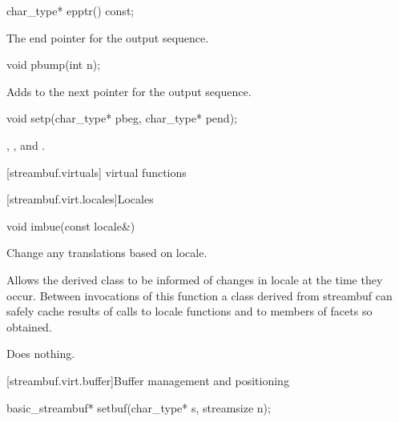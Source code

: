 %
\begin{itemdecl}
char_type* epptr() const;
\end{itemdecl}

\begin{itemdescr}
\pnum
\returns
The end pointer for the output sequence.
\end{itemdescr}

%
\begin{itemdecl}
void pbump(int n);
\end{itemdecl}

\begin{itemdescr}
\pnum
\effects
Adds  to the next pointer for the output sequence.
\end{itemdescr}

%
\begin{itemdecl}
void setp(char_type* pbeg, char_type* pend);
\end{itemdecl}

\begin{itemdescr}
\pnum
\postconditions
{},
,
and
.
\end{itemdescr}

[streambuf.virtuals]{ virtual functions}

[streambuf.virt.locales]{Locales}

%
\begin{itemdecl}
void imbue(const locale&)
\end{itemdecl}

\begin{itemdescr}
\pnum
\effects
Change any translations based on locale.

\pnum
\notes
Allows the derived class to be informed of changes in locale at the
time they occur.
Between invocations of this function a class derived
from streambuf can safely cache results of calls to locale functions
and to members of facets so obtained.

\pnum
{}
Does nothing.
\end{itemdescr}

[streambuf.virt.buffer]{Buffer management and positioning}

%
\begin{itemdecl}
basic_streambuf* setbuf(char_type* s, streamsize n);
\end{itemdecl}

